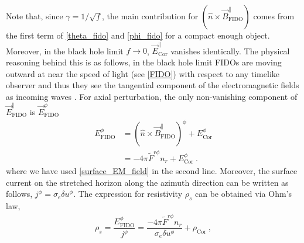 \documentclass[aps,prd,twocolumn,floatfix,noshowpacs,tightenlines,noshowkeys,superscriptaddress,amsmath,amssymb,
nofootinbib]{revtex4-1}
\renewcommand\[{\begin{equation}}
\renewcommand\]{\end{equation}}
\begin{document}
Note that, since $\gamma=1/\sqrt{f}$, the main contribution for $(\hat{n}\times \vec{B}^\parallel_{\textrm{FIDO}})$ comes from the first term of \autoref{theta_fido} and \autoref{phi_fido} for a compact enough object. Moreover, in the black hole limit $f\to 0$, $\vec{E}^\parallel_{\textrm{Cor}}$ vanishes identically. The physical reasoning behind this is as follows, in the black hole limit FIDOs are moving outward at near the speed of light (see \autoref{FIDO}) with respect to any timelike observer and thus they see the tangential component of the electromagnetic fields as incoming waves \cite{Thorne, PhysRevD.58.064011}. For axial perturbation, the only non-vanishing component of $\vec{E}^\parallel_{\textrm{FIDO}}$ is $\vec{E}^\phi_{\textrm{FIDO}}$
\begin{equation}\label{E_phi}
	\begin{aligned}
		{E}^\phi_{\textrm{FIDO}}&=(\hat{n}\times \vec{B}^\parallel_{\textrm{FIDO}})^{\phi}+{E}^\phi_{\textrm{Cor}}\\
		&=-4\pi \tilde{F}^{r\phi}n_r+{E}^\phi_{\textrm{Cor}}~.
	\end{aligned}
\end{equation}
where we have used \autoref{surface_EM_field} in the second line. Moreover, the surface current on the stretched horizon along the azimuth direction can be written as follows, $j^\phi=\sigma_{e} \delta u^\phi$. The expression for resistivity $\rho_{s}$ can be obtained via Ohm's law,
\begin{equation}\label{resistivity_1}
	\begin{aligned}
		\rho_{s}=\dfrac{{E}^\phi_{\textrm{FIDO}}}{j^\phi}=\dfrac{-4\pi \tilde{F}^{r\phi}n_r}{\sigma_{e} \delta u^\phi}+\rho_{\textrm{Cor}}~,
	\end{aligned}
\end{equation}
\end{document}

